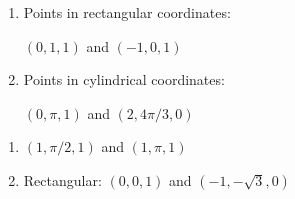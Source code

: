 {
\begin{enumerate}
	\item Points in rectangular coordinates:

$(0,1,1)$ and $(-1,0,1)$

	\item Points in cylindrical coordinates:
	
	$(0,\pi,1)$ and $(2,4\pi/3,0)$
	

\end{enumerate}
}
{\begin{enumerate}
	\item $(1,\pi/2,1)$ and $(1,\pi,1)$
	
	\item Rectangular: 	$(0,0,1)$ and $(-1,-\sqrt 3,0)$
	
\end{enumerate}
}
